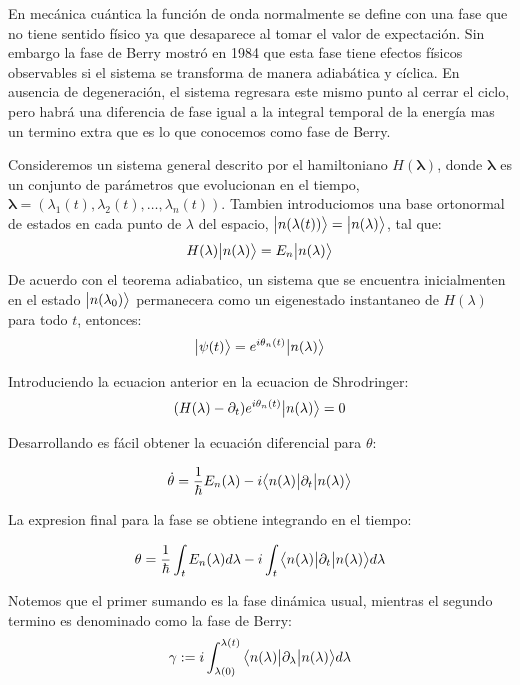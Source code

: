 En mecánica cuántica la función de onda normalmente se define con una fase que no tiene sentido físico ya que desaparece al tomar el valor de expectación. Sin embargo la fase de Berry mostró en 1984 que esta fase tiene efectos físicos observables si el sistema se transforma de manera adiabática y cíclica. En ausencia de degeneración, el sistema regresara este mismo punto al cerrar el ciclo, pero habrá una diferencia de fase igual a la integral temporal de la energía mas un termino extra que es lo que conocemos como fase de Berry.

Consideremos un sistema general descrito por el hamiltoniano $H(\mathbf{\lambda})$, donde $\mathbf{\lambda}$ es un conjunto de parámetros que evolucionan en el tiempo, $\mathbf{\lambda} = \left( \lambda_1(t), \lambda_2(t),\dots, \lambda_n(t)\right)$. Tambien introduciomos una base ortonormal de estados en cada punto de $\lambda$ del espacio, $\big |{n(\lambda(t))}\big \rangle = \big |{n(\lambda)}\big \rangle$, tal que:
\begin{equation}
    H(\lambda) \big |{n(\lambda)}\big \rangle =  E_n\big |{n(\lambda)}\big \rangle
\end{equation}
De acuerdo con el teorema adiabatico, un sistema que se encuentra inicialmenten en el estado $\big |{n(\lambda_0)}\big \rangle$ permanecera como un eigenestado instantaneo de $H(\lambda)$ para todo $t$, entonces:
\begin{align}
    \big |{\psi(t)}\big \rangle =  e^{i\theta_n(t)}\big |{n(\lambda)}\big \rangle
\end{align}

Introduciendo la ecuacion anterior en la ecuacion de Shrodringer:
\begin{align}
    (H(\lambda) - \partial_t) e^{i\theta_n(t)}\big |{n(\lambda)}\big \rangle =  0
\end{align}

Desarrollando es fácil obtener la ecuación diferencial para $\theta$:

\begin{align}
    \dot{\theta} = \frac{1}{\hbar} E_n(\lambda) - i \big \langle{n(\lambda)}\big | {\partial_t} \big | {n(\lambda)} \big \rangle
\end{align}

La expresion final para la fase se obtiene integrando en el tiempo:

\begin{align}
   \theta = \frac{1}{\hbar} \int_t E_n(\lambda) d\lambda - i \int_t \big \langle{n(\lambda)}\big | {\partial_t} \big | {n(\lambda)} \big \rangle d\lambda
\end{align}

Notemos que el primer sumando es la fase dinámica usual, mientras el segundo termino es denominado como la fase de Berry:
\begin{align}
    \gamma := i \int_{\lambda(0)}^{\lambda(t)} \big \langle{n(\lambda)}\big | {\partial_\lambda} \big | {n(\lambda)} \big \rangle d\lambda
\end{align}

